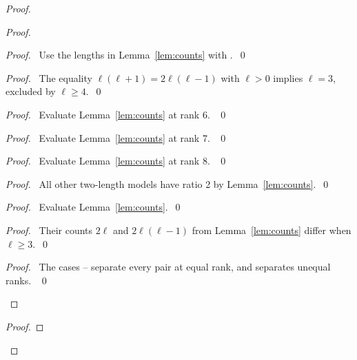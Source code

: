 \begin{proof}
\begin{proof}
\begin{proof}\pf\ Use the lengths in Lemma~\ref{lem:counts} with
.~\qed\end{proof}
\begin{proof}\pf\ The equality $\ell(\ell+1)=2\ell(\ell-1)$ with
$\ell>0$ implies $\ell=3$, excluded by $\ell\geq4$.~\qed\end{proof}
\begin{proof}\pf\ Evaluate Lemma~\ref{lem:counts} at rank 6. ~\qed\end{proof}
\begin{proof}\pf\ Evaluate Lemma~\ref{lem:counts} at rank 7. ~\qed\end{proof}
\begin{proof}\pf\ Evaluate Lemma~\ref{lem:counts} at rank 8. ~\qed\end{proof}
\begin{proof}\pf\ All other two-length models have ratio 2 by
Lemma~\ref{lem:counts}.~\qed\end{proof}
\begin{proof}\pf\ Evaluate Lemma~\ref{lem:counts}.~\qed\end{proof}
\begin{proof}\pf\ Their counts $2\ell$ and $2\ell(\ell-1)$ from
Lemma~\ref{lem:counts} differ when $\ell\geq3$.~\qed\end{proof}
\qedstep
\begin{proof}\pf\ The cases --
separate every pair at equal rank, and  separates
unequal ranks. ~\qed\end{proof}
\end{proof}
\begin{proof}

\end{proof}
\end{proof}
